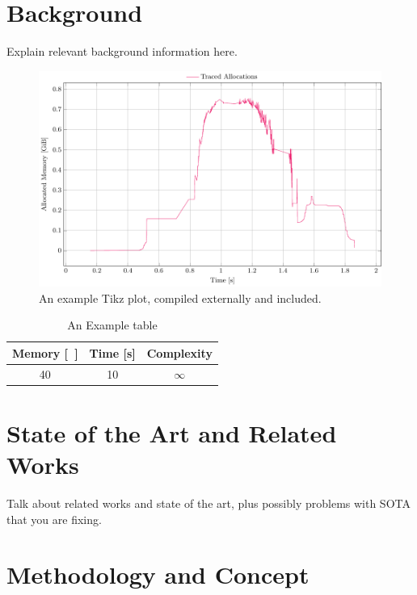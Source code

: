 \documentclass{article}
\begin{document}
\lipsum[5]
 \section{Background}\label{sec:background}

Explain relevant background information here.

\lipsum[6-8]

\begin{figure}
	\centering
	\includegraphics[width=\textwidth]{example}
	\caption{An example Tikz plot, compiled externally and
	included.}\label{fig:example}
\end{figure}

\lipsum[9-11]

\begin{table}[t]
	\centering
	\caption{An Example table}\label{tab:example}
	\begin{tabular}{ccc}
	\toprule
	Memory [\si{\mebi\byte}] & Time [\si{\second}] & Complexity \\
	\midrule
	40 & 10 & \(\infty\) \\
	\bottomrule
\end{tabular}
 \end{table}
 \section{State of the Art and Related Works}\label{sec:sota}

Talk about related works and state of the art, plus possibly problems with
SOTA that you are fixing.

\lipsum[12-14]
 \section{Methodology and Concept}\label{sec:methodology}
\end{document}
